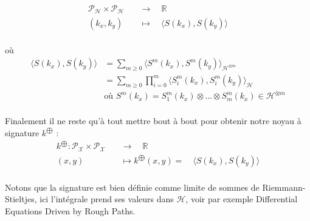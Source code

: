 \documentclass[10pt,a4paper]{article}
\begin{document}
\begin{align*}
\mathcal{P}_{\mathcal{H}} \times \mathcal{P}_{\mathcal{H}} & \quad \rightarrow \quad \mathbb{R} \\
(k_x , k_y ) & \quad \mapsto \quad \langle S(k_x ),  S(k_y ) \rangle \\
\end{align*}
 
où \begin{align*}
\langle S(k_x ),  S(k_y ) \rangle & = \sum_{m\geq 0} \langle S^m (k_x ), S^m (k_y ) \rangle _{\mathcal{H}^{\otimes m}} \\
&=\sum_{m\geq 0} \prod_{i=0}^m \langle S^m_i (k_x ), S^m_i (k_y ) \rangle _{\mathcal{H}}\\
& \text{où } S^m(k_x )= S^m_1(k_x ) \otimes \ldots \otimes S^m_m(k_x ) \in \mathcal{H}^{\otimes m}\\
\end{align*}

Finalement il ne reste qu'à tout mettre bout à bout pour obtenir notre noyau à signature $k^{\bigoplus}$ : 
\begin{align*}
k^{\bigoplus} : \mathcal{P}_{\mathcal{X}} \times \mathcal{P}_{\mathcal{X}} & \quad \rightarrow \quad \mathbb{R} \\
(x ,y) & \quad \mapsto k^{\bigoplus}(x, y) = \quad \langle S(k_x ),  S(k_y ) \rangle \\
\end{align*}

Notons que la signature est bien définie comme limite de sommes de Riemmann-Stieltjes, ici l'intégrale prend ses valeurs dans $\mathcal{H}$, voir par exemple Differential Equations Driven by Rough Paths.
\end{document}
